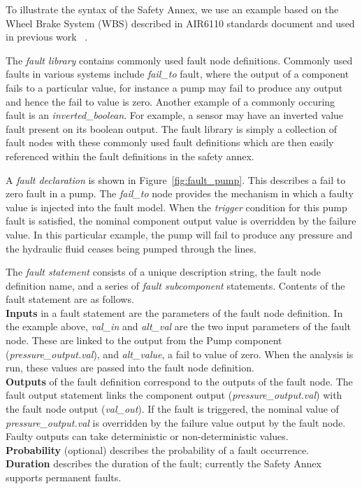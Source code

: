 To illustrate the syntax of the Safety Annex, we use an example based on the Wheel Brake System (WBS) described in AIR6110 standards document and used in  previous work ~\cite{Stewart17:IMBSA, AIR6110}.

The \textit{fault library} contains commonly used fault node definitions. Commonly used faults in various systems include \textit{fail\_to} fault, where the output of a component fails to a particular value, for instance a pump may fail to produce any output and hence the fail to value is zero. Another example of a commonly occuring fault is an \textit{inverted\_boolean}. For example, a sensor may have an inverted value fault present on its boolean output. The fault library is simply a collection of fault nodes with these commonly used fault definitions which are then easily referenced within the fault definitions in the safety annex. 


A \textit{fault declaration} is shown in Figure~\ref{fig:fault_pump}. This describes a fail to zero fault in a pump. The \textit{fail\_to} node provides the mechanism in which a faulty value is injected into the fault model. When the \textit{trigger} condition for this pump fault is satisfied, the nominal component output value is overridden by the failure value. In this particular example, the pump will fail to produce any pressure and the hydraulic fluid ceases being pumped through the lines.  

The \textit{fault statement} consists of a unique description string, the fault node definition name, and a series of \textit{fault subcomponent} statements. Contents of the fault statement are as follows.\\
\textbf{Inputs} in a fault statement are the parameters of the fault node definition. In the example above, \textit{val\_in} and \textit{alt\_val} are the two input parameters of the fault node. These are linked to the output from the Pump component (\textit{pressure\_output.val}), and \textit{alt\_value}, a fail to value of zero. When the analysis is run, these values are passed into the fault node definition.\\
\textbf{Outputs} of the fault definition correspond to the outputs of the fault node. The fault output statement links the component output (\textit{pressure\_output.val}) with the fault node output (\textit{val\_out}). If the fault is triggered, the nominal value of \textit{pressure\_output.val} is overridden by the failure value output by the fault node. Faulty outputs can take deterministic or non-deterministic values. \\
\textbf{Probability} (optional) describes the probability of a fault occurrence.\\
\textbf{Duration} describes the duration of the fault; currently the Safety Annex supports permanent faults.\\

